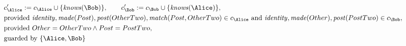 \begin{align*}
&
c'_
{
\Alice
}
 := 
c_
{
\Alice
}
 \cup 
\{
\mathit{\detokenize{
knows
}}
(
\Bob
)
\}
, \qquad 
c'_
{
\Bob
}
 := 
c_
{
\Bob
}
 \cup 
\{
\mathit{\detokenize{
knows
}}
(
\Alice
)
\}
,\\
&
\text{provided } 
\mathit{\detokenize{
identity
}}
,
\mathit{\detokenize{
made
}}
(
Post
)
,
\mathit{\detokenize{
post
}}
(
OtherTwo
)
,
\mathit{\detokenize{
match
}}
(
Post
,
OtherTwo
)
 \in c_
{
\Alice
}
 \text{ and } 
\mathit{\detokenize{
identity
}}
,
\mathit{\detokenize{
made
}}
(
Other
)
,
\mathit{\detokenize{
post
}}
(
PostTwo
)
 \in c_
{
\Bob
}
,\\
&
\text{provided } 
Other
=
OtherTwo
\land
Post
=
PostTwo
,\\
&
\text{guarded by } \{
\Alice
,
\Bob
\}
\end{align*}
